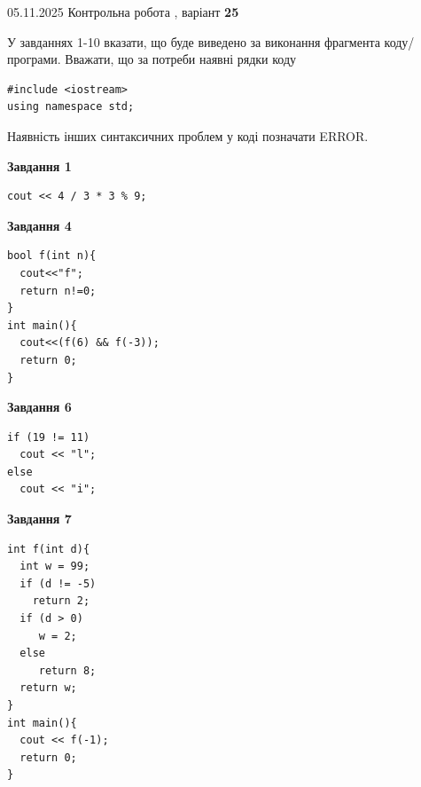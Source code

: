 \documentclass[12pt, ukrainian]{article}
\begin{document}
{\Large{05.11.2025 Контрольна робота , варіант  \No \textbf { 25 }\par}}
{
\begin {large}
У завданнях 1-10 вказати, що буде виведено за виконання фрагмента коду/про\-гра\-ми.
Вважати, що за потреби наявні рядки коду
\begin{verbatim}
#include <iostream>
using namespace std;
\end{verbatim}
Наявність інших синтаксичних проблем у коді позначати ERROR.

\begin{minipage}[t]{7.0cm}

\begin{center}
\textbf{Завдання 1}
\end{center}
\vspace{-8mm}

\begin{verbatim}
cout << 4 / 3 * 3 % 9;
\end{verbatim}



\begin{center}
\textbf{Завдання 4}
\end{center}
\vspace{-8mm}

\begin{verbatim}
bool f(int n){
  cout<<"f";
  return n!=0;
}
int main(){
  cout<<(f(6) && f(-3));
  return 0;
}
\end{verbatim}



\begin{center}
\textbf{Завдання 6}
\end{center}
\vspace{-8mm}

\begin{verbatim}
if (19 != 11)
  cout << "l";
else
  cout << "i";
\end{verbatim}



\begin{center}
\textbf{Завдання 7}
\end{center}
\vspace{-8mm}

\begin{verbatim}
int f(int d){
  int w = 99;
  if (d != -5)
    return 2;
  if (d > 0)
     w = 2;
  else
     return 8;
  return w;
}
int main(){
  cout << f(-1);
  return 0;
}
\end{verbatim}


\end{minipage}
\end{large}}
\end{document}
